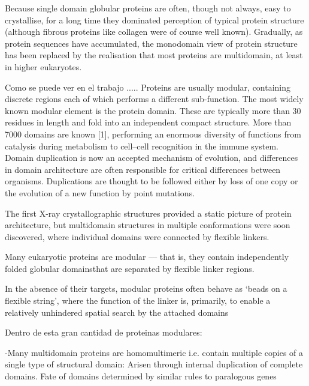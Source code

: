 Because single domain globular proteins are often, though not always, easy to crystallise, for a long time they dominated perception of typical protein structure (although fibrous proteins like collagen were of course well known).
Gradually, as protein
sequences have accumulated, the monodomain view of protein
structure has been replaced by the realisation that most proteins
are multidomain, at least in higher eukaryotes.



Como se puede ver en el trabajo \cite{neduva2005linear}.....
Proteins are usually modular, containing discrete regions each of which performs a different sub-function. 
The most widely known modular element is the protein domain. These are typically more than 30 residues in length and fold into an independent compact structure. 
More than 7000 domains are known [1], performing an enormous diversity of functions from catalysis during metabolism to cell–cell recognition in the
immune system. Domain duplication is now an accepted mechanism of evolution, and differences in domain architecture are often responsible for critical differences between organisms.
Duplications are thought to be followed either by loss of one copy or the evolution of a new function by point mutations.













The first X-ray crystallographic structures provided a static picture of protein architecture, but multidomain structures in multiple conformations were soon discovered, where individual domains were connected by flexible linkers.

Many eukaryotic proteins are modular — that is, they contain independently folded globular domainsthat are separated by flexible linker regions. 

In the absence of their targets, modular proteins
often behave as ‘beads on a flexible string’, where the
function of the linker is, primarily, to enable a relatively
unhindered spatial search by the attached domains


Dentro de esta gran cantidad de proteinas modulares:

-Many multidomain proteins are homomultimeric i.e. contain multiple copies of a single type of structural domain: Arisen through internal duplication of complete domains. Fate of domains determined by similar rules to paralogous genes

